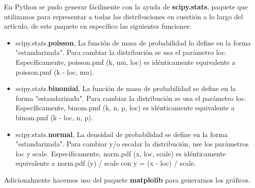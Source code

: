 \documentclass[12pt,a4paper]{article}
\begin{document}
\begin{multicols}{2}
    En Python se pudo generar fácilmente con la ayuda de \textbf{scipy.stats}, paquete que utilizamos para representar a todas las  distribuciones  en cuestión a lo largo del artículo, de este paquete en específico las siguientes funciones:
    \begin{itemize}
        \item scipy.stats.\textbf{poisson}, La función de masa de probabilidad lo define en la forma "estandarizada". Para cambiar la distribución se usa el parámetro loc. Específicamente, poisson.pmf (k, mu, loc) es idénticamente equivalente a poisson.pmf (k - loc, mu).
        \item scipy.stats.\textbf{binomial}, La función de masa de probabilidad se define en la forma "estandarizada". Para cambiar la distribución se usa el parámetro loc. Específicamente, binom.pmf (k, n, p, loc) es idénticamente equivalente a binom.pmf (k - loc, n, p).
        \item scipy.stats.\textbf{normal}, La densidad de probabilidad se define en la forma "estandarizada". Para cambiar y/o escalar la distribución, use los parámetros loc y scale. Específicamente, norm.pdf (x, loc, scale) es idénticamente equivalente a norm.pdf (y) / scale con y = (x - loc) / scale.
    \end{itemize} 
    Adicionalmente hacemos uso del paquete \textbf{matplolib} para generarnos los gráficos.
    

\end{multicols}
\end{document}
